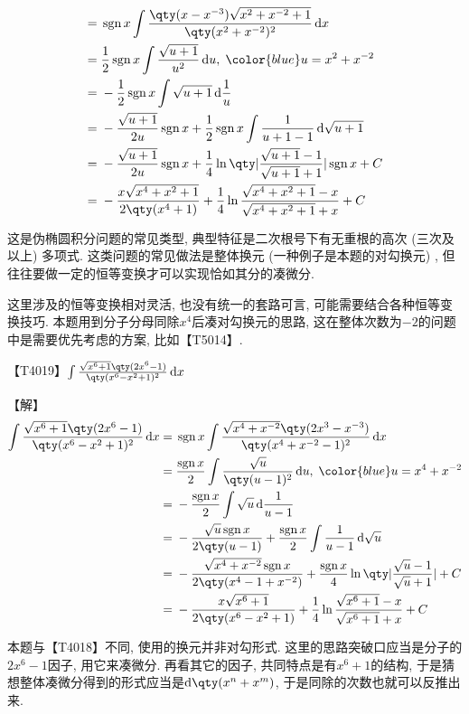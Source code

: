 \documentclass{ctexbook}
\DeclareMathOperator{\sgn}{sgn}
\newcommand*{\dif}{\mathop{}\!\mathrm{d}}
\begin{document}
{\begin{align*}
={}&\sgn{x}\int\frac{\qty(x-x^{-3})\sqrt{x^{2}+x^{-2}+1}}{\qty(x^{2}+x^{-2})^{2}}\dif{x}\\
={}&\frac{1}{2}\sgn{x}\int\frac{\sqrt{u+1}}{u^{2}}\dif{u},\;{\color{blue}u=x^{2}+x^{-2}}\\
={}&-\frac{1}{2}\sgn{x}\int\sqrt{u+1}\dif{\frac{1}{u}}\\
={}&-\frac{\sqrt{u+1}}{2u}\sgn{x}+\frac{1}{2}\sgn{x}\int\frac{1}{u+1-1}\dif{\sqrt{u+1}}\\
={}&-\frac{\sqrt{u+1}}{2u}\sgn{x}+\frac{1}{4}\ln\qty|\frac{\sqrt{u+1}-1}{\sqrt{u+1}+1}|\sgn{x}+C\\
={}&-\frac{x\sqrt{x^{4}+x^{2}+1}}{2\qty(x^{4}+1)}+\frac{1}{4}\ln{\frac{\sqrt{x^{4}+x^{2}+1}-x}{{\sqrt{x^{4}+x^{2}+1}}+x}}+C
\end{align*}\par
{\kaishu 这是伪椭圆积分问题的常见类型, 典型特征是二次根号下有无重根的高次 (三次及以上) 多项式. 这类问题的常见做法是整体换元 (一种例子是本题的对勾换元) , 但往往要做一定的恒等变换才可以实现恰如其分的凑微分. \par
这里涉及的恒等变换相对灵活, 也没有统一的套路可言, 可能需要结合各种恒等变换技巧. 本题用到分子分母同除$x^{4}$后凑对勾换元的思路, 这在整体次数为$-2$的问题中是需要优先考虑的方案, 比如【T5014】. \par}
【T4019】$\int\frac{\sqrt{x^{6}+1}\qty(2x^{6}-1)}{\qty(x^{6}-x^{2}+1)^{2}}\dif{x}$\par
【解】
\begin{align*}
\int\frac{\sqrt{x^{6}+1}\qty(2x^{6}-1)}{\qty(x^{6}-x^{2}+1)^{2}}\dif{x}={}&\sgn{x}\int\frac{\sqrt{x^{4}+x^{-2}}\qty(2x^{3}-x^{-3})}{\qty(x^{4}+x^{-2}-1)^{2}}\dif{x}\\
={}&\frac{\sgn{x}}{2}\int\frac{\sqrt{u}}{\qty(u-1)^{2}}\dif{u},\;{\color{blue}u=x^{4}+x^{-2}}\\
={}&-\frac{\sgn{x}}{2}\int\sqrt{u}\dif{\frac{1}{u-1}}\\
={}&-\frac{\sqrt{u}\sgn{x}}{2\qty(u-1)}+\frac{\sgn{x}}{2}\int\frac{1}{u-1}\dif{\sqrt{u}}\\
={}&-\frac{\sqrt{x^{4}+x^{-2}}\sgn{x}}{2\qty(x^{4}-1+x^{-2})}+\frac{\sgn{x}}{4}\ln\qty|\frac{\sqrt{u}-1}{\sqrt{u}+1}|+C\\
={}&-\frac{x\sqrt{x^{6}+1}}{2\qty(x^{6}-x^{2}+1)}+\frac{1}{4}\ln{\frac{\sqrt{x^{6}+1}-x}{\sqrt{x^{6}+1}+x}}+C
\end{align*}\par
{\kaishu 本题与【T4018】不同, 使用的换元并非对勾形式. 这里的思路突破口应当是分子的$2x^{6}-1$因子, 用它来凑微分. 再看其它的因子, 共同特点是有$x^{6}+1$的结构, 于是猜想整体凑微分得到的形式应当是$\dif{\qty(x^{n}+x^{m})}$, 于是同除的次数也就可以反推出来. \par}
}
\end{document}
